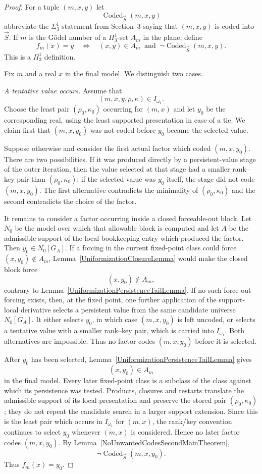\documentclass[a4paper,11pt]{article}
\begin{document}
\begin{proof}
For a tuple $(m,x,y)$ let
\[
\operatorname{Coded}_{\vec S}(m,x,y)
\]
abbreviate the $\Sigma^1_3$-statement from Section~3 saying that $(m,x,y)$ is coded into $\vec S$. If $m$ is the G\"odel number of a $\Pi^1_3$-set $A_m$ in the plane, define
\[
f_m(x)=y
\quad\Longleftrightarrow\quad
(x,y)\in A_m
\ \text{ and }\
\neg\operatorname{Coded}_{\vec S}(m,x,y).
\]
This is a $\Pi^1_3$ definition.

Fix $m$ and a real $x$ in the final model. We distinguish two cases.

\medskip
\noindent
\emph{A tentative value occurs.}
Assume that
\[
(m,x,y,\rho,\kappa)\in I_{\omega_1}.
\]
Choose the least pair $(\rho_0,\kappa_0)$ occurring for $(m,x)$ and let $y_0$ be the corresponding real, using the least supported presentation in case of a tie. We claim first that $(m,x,y_0)$ was not coded before $y_0$ became the selected value.

Suppose otherwise and consider the first actual factor which coded $(m,x,y_0)$. There are two possibilities. If it was produced directly by a persistent-value stage of the outer iteration, then the value selected at that stage had a smaller rank--key pair than $(\rho_0,\kappa_0)$; if the selected value was $y_0$ itself, the stage did not code $(m,x,y_0)$. The first alternative contradicts the minimality of $(\rho_0,\kappa_0)$ and the second contradicts the choice of the factor.

It remains to consider a factor occurring inside a closed forceable-out block. Let $N_0$ be the model over which that allowable block is computed and let $A$ be the admissible support of the local bookkeeping entry which produced the factor. Then $y_0\in N_0[G_A]$. If a forcing in the current fixed-point class could force $(x,y_0)\notin A_m$, Lemma~\ref{UniformizationClosureLemma} would make the closed block force
\[
(x,y_0)\notin A_m,
\]
contrary to Lemma~\ref{UniformizationPersistenceTailLemma}. If no such force-out forcing exists, then, at the fixed point, one further application of the support-local derivative selects a persistent value from the same candidate universe $N_0[G_A]$. It either selects $y_0$, in which case $(m,x,y_0)$ is left uncoded, or selects a tentative value with a smaller rank--key pair, which is carried into $I_{\omega_1}$. Both alternatives are impossible. Thus no factor codes $(m,x,y_0)$ before it is selected.

After $y_0$ has been selected, Lemma~\ref{UniformizationPersistenceTailLemma} gives
\[
(x,y_0)\in A_m
\]
in the final model. Every later fixed-point class is a subclass of the class against which its persistence was tested. Products, closures and restarts translate the admissible support of its local presentation and preserve the stored pair $(\rho_0,\kappa_0)$; they do not repeat the candidate search in a larger support extension. Since this is the least pair which occurs in $I_{\omega_1}$ for $(m,x)$, the rank/key convention continues to select $y_0$ whenever $(m,x)$ is considered. Hence no later factor codes $(m,x,y_0)$. By Lemma~\ref{NoUnwantedCodesSecondMainTheorem},
\[
\neg\operatorname{Coded}_{\vec S}(m,x,y_0).
\]
Thus $f_m(x)=y_0$.


\end{proof}
\end{document}
